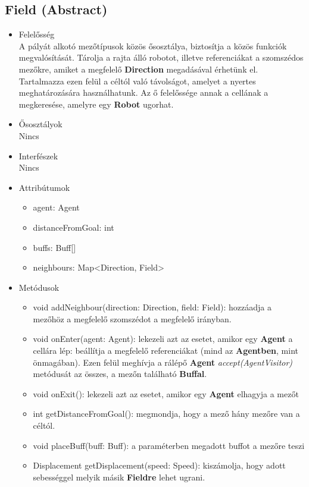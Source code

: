 \subsection{Field (Abstract)}
\begin{itemize}

\item Felelősség\\
    A pályát alkotó mezőtípusok közös ősosztálya, biztosítja a közös funkciók megvalósítását. Tárolja a rajta álló robotot, illetve referenciákat a szomszédos mezőkre, amiket a megfelelő \textbf{Direction} megadásával érhetünk el. Tartalmazza ezen felül a céltól való távolságot, amelyet a nyertes meghatározására használhatunk. Az ő felelőssége annak a cellának a megkeresése, amelyre egy \textbf{Robot} ugorhat. 

\item Ősosztályok\\
Nincs

\item Interfészek\\
Nincs

\item Attribútumok\\
    \begin{itemize}
            \item agent: Agent
            \item distanceFromGoal: int 
            \item buffs: Buff[]
            \item neighbours: Map<Direction, Field>
    \end{itemize}

\item Metódusok\\

\begin{itemize}
    \item void addNeighbour(direction: Direction, field: Field): hozzáadja a mezőhöz a megfelelő szomszédot a megfelelő irányban.
    \item void onEnter(agent: Agent): lekezeli azt az esetet, amikor egy \textbf{Agent} a cellára lép: beállítja a megfelelő referenciákat (mind az \textbf{Agentben}, mint önmagában). Ezen felül meghívja a rálépő \textbf{Agent} \textit{accept(AgentVisitor)} metódusát az összes, a mezőn található \textbf{Buffal}. 
    \item void onExit(): lekezeli azt az esetet, amikor egy \textbf{Agent} elhagyja a mezőt
    \item int getDistanceFromGoal(): megmondja, hogy a mező hány mezőre van a céltól.
    \item void placeBuff(buff: Buff): a paraméterben megadott buffot a mezőre teszi
    \item Displacement getDisplacement(speed: Speed): kiszámolja, hogy adott sebességgel melyik másik \textbf{Fieldre} lehet ugrani.
\end{itemize}

\end{itemize}

